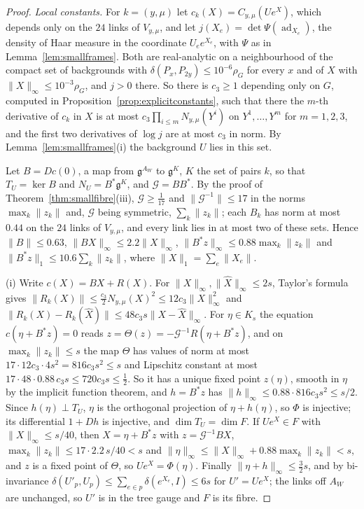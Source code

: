 \documentclass[11pt]{amsart}
\theoremstyle{definition}
\theoremstyle{remark}
\numberwithin{equation}{section}
\newcommand{\g}{\mathfrak{g}}
\begin{document}
\begin{proof}
\emph{Local constants.} For $k=(y,\mu)$ let $c_k(X)=C_{y,\mu}(Ue^X)$, which
depends only on the $24$ links of $V_{y,\mu}$, and let $j(X_e)=\det\Psi(
\operatorname{ad}_{X_e})$, the density of Haar measure in the coordinate
$U_ee^{X_e}$, with $\Psi$ as in Lemma~\ref{lem:smallframes}. Both are
real-analytic on a neighbourhood of the compact set of backgrounds with
$\delta(P_x,P_{2y})\le10^{-6}\rho_G$ for every $x$ and of $X$ with $\lVert X
\rVert_\infty\le10^{-3}\rho_G$, and $j>0$ there. So there is $c_3\ge1$
depending only on $G$, computed in Proposition~\ref{prop:explicitconstants},
such that there the $m$-th derivative of $c_k$ in $X$
is at most $c_3\prod_{i\le m}N_{y,\mu}(Y^i)$ on $Y^1,\dots,Y^m$ for $m=1,2,
3$, and the first two derivatives of $\log j$ are at most $c_3$ in norm. By
Lemma~\ref{lem:smallframes}(i) the background $U$ lies in this set.

Let $B=Dc(0)$, a map from $\g^{A_W}$ to $\g^K$, $K$ the set of pairs $k$,
so that $T_U=\ker B$ and $N_U=B^*\g^K$, and $\mathcal G=BB^*$. By the
proof of Theorem~\ref{thm:smallfibre}(iii), $\mathcal G\ge\frac1{17}$ and
$\lVert\mathcal G^{-1}\rVert\le17$ in the norms $\max_k\lVert z_k\rVert$
and, $\mathcal G$ being symmetric, $\sum_k\lVert z_k\rVert$; each $B_k$
has norm at most $0.44$ on the $24$ links of $V_{y,\mu}$, and every link
lies in at most two of these sets. Hence $\lVert B\rVert\le0.63$, $\lVert
BX\rVert_\infty\le2.2\lVert X\rVert_\infty$, $\lVert B^*z\rVert_\infty\le
0.88\max_k\lVert z_k\rVert$ and $\lVert B^*z\rVert_1\le10.6\sum_k\lVert
z_k\rVert$, where $\lVert X\rVert_1=\sum_e\lVert X_e\rVert$.

(i) Write $c(X)=BX+R(X)$. For $\lVert X\rVert_\infty,\lVert\hat X\rVert
_\infty\le2s$, Taylor's formula gives $\lVert R_k(X)\rVert\le\frac{c_3}2
N_{y,\mu}(X)^2\le12c_3\lVert X\rVert_\infty^2$ and $\lVert R_k(X)-R_k(\hat
X)\rVert\le48c_3s\lVert X-\hat X\rVert_\infty$. For $\eta\in K_s$ the
equation $c(\eta+B^*z)=0$ reads $z=\Theta(z)=-\mathcal G^{-1}R(\eta+B^*z)$,
and on $\max_k\lVert z_k\rVert\le s$ the map $\Theta$ has values of norm at
most $17\cdot12c_3\cdot4s^2=816c_3s^2\le s$ and Lipschitz constant at most
$17\cdot48\cdot0.88\,c_3s\le720c_3s\le\frac12$. So it has a unique fixed
point $z(\eta)$, smooth in $\eta$ by the implicit function theorem, and
$h=B^*z$ has $\lVert h\rVert_\infty\le0.88\cdot816c_3s^2\le s/2$. Since
$h(\eta)\perp T_U$, $\eta$ is the orthogonal projection of $\eta+h(\eta)$,
so $\Phi$ is injective; its differential $1+Dh$ is injective, and $\dim T
_U=\dim F$. If $Ue^X\in F$ with $\lVert X\rVert_\infty\le s/40$, then $X=
\eta+B^*z$ with $z=\mathcal G^{-1}BX$, $\max_k\lVert z_k\rVert\le17\cdot2.2
\,s/40<s$ and $\lVert\eta\rVert_\infty\le\lVert X\rVert_\infty+0.88\max_k
\lVert z_k\rVert<s$, and $z$ is a fixed point of $\Theta$, so $Ue^X=\Phi(
\eta)$. Finally $\lVert\eta+h\rVert_\infty\le\frac32s$, and by
bi-invariance $\delta(U'_p,U_p)\le\sum_{e\in p}\delta(e^{X_e},I)\le6s$ for
$U'=Ue^X$; the links off $A_W$ are unchanged, so $U'$ is in the tree gauge
and $F$ is its fibre.


\end{proof}
\end{document}
